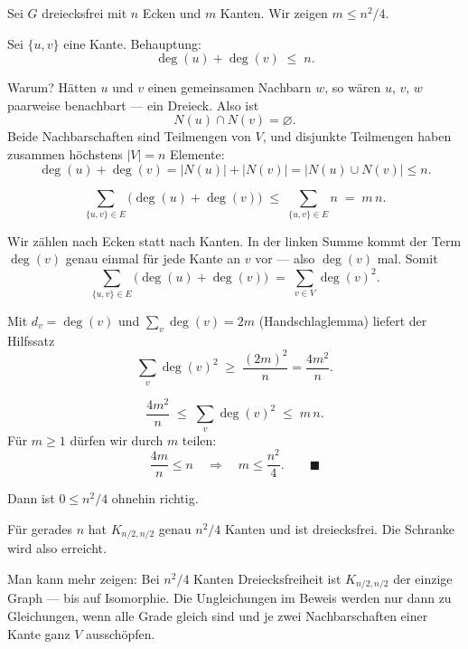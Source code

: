 \begin{merksatz}
Sei $G$ dreiecksfrei mit $n$ Ecken und $m$ Kanten. Wir zeigen $m \le n^2/4$.

Sei $\{u,v\}$ eine Kante. Behauptung:
\[ \deg(u) + \deg(v) \;\le\; n . \]

Warum? Hätten $u$ und $v$ einen gemeinsamen Nachbarn $w$, so wären $u$, $v$, $w$ paarweise benachbart --- ein Dreieck. Also ist
\[ N(u) \cap N(v) = \varnothing . \]
Beide Nachbarschaften sind Teilmengen von $V$, und disjunkte Teilmengen haben zusammen höchstens $|V| = n$ Elemente:
\[ \deg(u) + \deg(v) = |N(u)| + |N(v)| = |N(u) \cup N(v)| \le n . \]

\[ \sum_{\{u,v\} \in E} \bigl(\deg(u) + \deg(v)\bigr) \;\le\; \sum_{\{u,v\} \in E} n \;=\; m\,n . \]

Wir zählen nach Ecken statt nach Kanten. In der linken Summe kommt der Term $\deg(v)$ genau einmal für jede Kante an $v$ vor --- also $\deg(v)$ mal. Somit
\[ \sum_{\{u,v\} \in E} \bigl(\deg(u) + \deg(v)\bigr) \;=\; \sum_{v \in V} \deg(v)^2 . \]

Mit $d_v = \deg(v)$ und $\sum_v \deg(v) = 2m$ (Handschlaglemma) liefert der Hilfssatz
\[ \sum_{v} \deg(v)^2 \;\ge\; \frac{(2m)^2}{n} = \frac{4m^2}{n} . \]

\[ \frac{4m^2}{n} \;\le\; \sum_v \deg(v)^2 \;\le\; m\,n . \]
Für $m \ge 1$ dürfen wir durch $m$ teilen:
\[ \frac{4m}{n} \le n \quad\Longrightarrow\quad m \le \frac{n^2}{4} . \qquad \blacksquare \]

Dann ist $0 \le n^2/4$ ohnehin richtig.
\end{merksatz}

\begin{merksatz}
Für gerades $n$ hat $K_{n/2, n/2}$ genau $n^2/4$ Kanten und ist dreiecksfrei. Die Schranke wird also erreicht.

Man kann mehr zeigen: Bei $n^2/4$ Kanten  Dreiecksfreiheit ist $K_{n/2,n/2}$ der einzige Graph --- bis auf Isomorphie. Die Ungleichungen im Beweis werden nur dann zu Gleichungen, wenn alle Grade gleich sind und je zwei Nachbarschaften einer Kante ganz $V$ ausschöpfen.

\begin{center}
\begin{minipage}{0.88\textwidth}
\end{minipage}
\end{center}
\end{merksatz}

